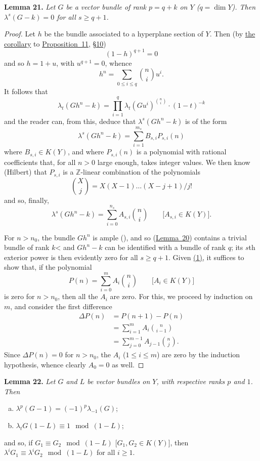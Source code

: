 \documentclass{article}
\newenvironment{itenv}[1]
  {\phantomsection\par\medskip\noindent\textbf{#1.}\itshape}
  {\par\medskip}
\renewcommand{\geq}{\geqslant}
\renewcommand{\leq}{\leqslant}
\newcommand{\oldpage}[1]{\marginpar{\footnotesize$\Big\vert$ \textit{p.~#1}}}
\begin{document}
\begin{itenv}{Lemma 21}
\label{lemma21}
  Let $G$ be a vector bundle of rank $p=q+k$ on $Y$ ($q=\dim Y$).
  Then $\lambda^s(G- k)=0$ for all $s\geq q+1$.
\end{itenv}

\begin{proof}
  Let $h$ be the bundle associated to a hyperplane section of $Y$.
  Then (by \hyperref[corollary-11]{the corollary} to \hyperref[proposition11]{Proposition~11}, \hyperref[section10]{\S10})
  \[
    (1-h)^{q+1} = 0
  \]
  and so $h=1+u$, with $u^{q+1}=0$, whence
  \[
    h^n = \sum_{0\leq i\leq q}\binom{n}{i}u^i.
  \]
  It follows that
  \[
    \lambda_t(Gh^n- k) = \prod_{i=1}^q \lambda_t(Gu^i)^{\binom{n}{i}}\cdot(1-t)^{-k}
  \]
  and the reader can, from this, deduce that $\lambda^s(Gh^n- k)$ is of the form
  \[
    \lambda^s(Gh^n- k) = \sum_{i=1}^{m_s} B_{s,i}P_{s,i}(n)
  \]
  where $B_{s,i}\in K(Y)$, and where $P_{s,i}(n)$ is a polynomial with rational coefficients that, for all $n>0$ large enough, takes integer values.
  We then know (Hilbert) that $P_{s,i}$ is a $\mathbb{Z}$-linear combination of the polynomials
  \[
    \binom{X}{j} = X(X-1)\ldots(X-j+1)/j!
  \]
  and so, finally,
  \[
  \label{lemma21equation1}
    \lambda^s(Gh^n- k) = \sum_{i=0}^{n_s} A_{s,i}\binom{n}{i}
    \qquad\mbox{[$A_{s,i}\in K(Y)$].}
    \tag{1}
  \]

  For $n>n_0$, the bundle $Gh^n$ is ample (\cite{12}), and so (\hyperref[lemma20]{Lemma~20}) contains a trivial bundle of rank $k$< and $Gh^n- k$ can be identified with a bundle of rank $q$;
  its $s$th exterior power is then evidently zero for all $s\geq q+1$.
  Given \hyperref[lemma21equation1]{(1)}, it
\oldpage{134}
  suffices to show that, if the polynomial
  \[
    P(n) = \sum_{i=0}^m A_i\binom{n}{i}
    \qquad\mbox{[$A_i\in K(Y)$]}
  \]
  is zero for $n>n_0$, then all the $A_i$ are zero.
  For this, we proceed by induction on $m$, and consider the first difference
  \begin{align*}
    \Delta P(n)
    &= P(n+1) - P(n)
  \\&= \sum_{i=1}^m A_i\binom{n}{i-1}
  \\&= \sum_{j=0}^{m-1} A_{j-1}\binom{n}{j}.
  \end{align*}
  Since $\Delta P(n)=0$ for $n>n_0$, the $A_i$ ($1\leq i\leq m$) are zero by the induction hypothesis, whence clearly $A_0=0$ as well.
\end{proof}

\begin{itenv}{Lemma 22}
\label{lemma22}
  Let $G$ and $L$ be vector bundles on $Y$, with respective ranks $p$ and $1$.
  Then
  \begin{enumerate}[(a)]
    \item $\lambda^p(G-1) = (-1)^p\lambda_{-1}(G)$;
    \item $\lambda_t G(1- L) \equiv 1\mod(1-L)$;
  \end{enumerate}
  and so, if $G_1\equiv G_2\mod(1-L)$ [$G_1,G_2\in K(Y)$], then $\lambda^iG_1\equiv\lambda^iG_2\mod(1-L)$ for all $i\geq1$.
\end{itenv}
\end{document}
